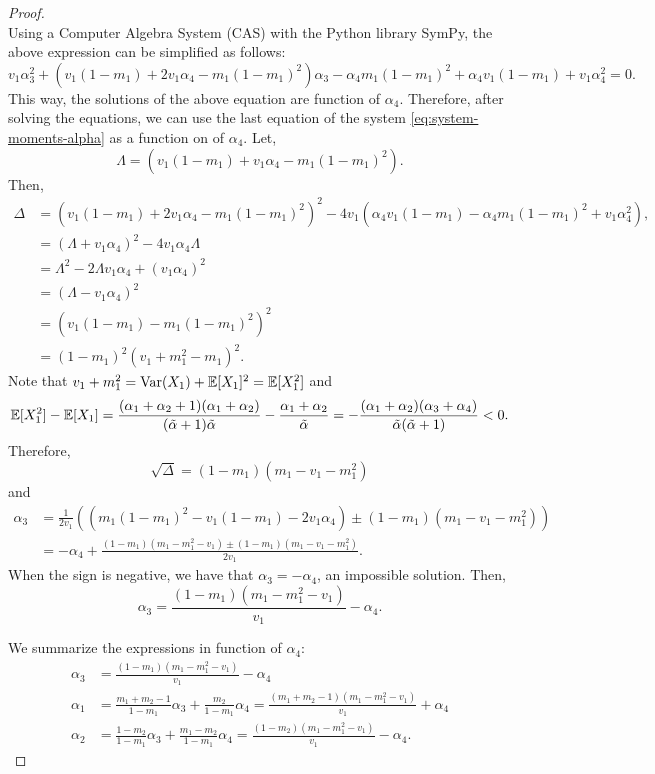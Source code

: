 \begin{proof}
\begin{equation*}
\end{equation*}
Using a Computer Algebra System (CAS) with the Python library SymPy, the above
expression can be simplified as follows:
$$
v_1\alpha_3^2 + \left(v_1(1-m_1) + 2v_1\alpha_4 - m_1(1-m_1)^2\right)\alpha_3 - \alpha_4m_1(1-m_1)^2 + \alpha_4v_1(1 - m_1) + v_1\alpha_4^2 = 0.
$$
This way, the solutions of the above equation are function of $\alpha_4$.
Therefore, after solving the equations, we can use the last equation of the
system \eqref{eq:system-moments-alpha} as a function on of $\alpha_4$. Let, 
$$
\Lambda = \left(v_1(1-m_1) + v_1\alpha_4 - m_1(1-m_1)^2\right).
$$
Then, 
\begin{equation*}
  \begin{split}
    \Delta &= \left(v_1(1-m_1) + 2v_1\alpha_4 - m_1(1-m_1)^2\right)^2 - 4v_1(\alpha_4v_1(1 - m_1) - \alpha_4m_1(1-m_1)^2 + v_1\alpha_4^2), \\
    &= \left(\Lambda + v_1\alpha_4\right)^2 - 4v_1\alpha_4\Lambda \\
    &= \Lambda^2 - 2\Lambda v_1\alpha_4 + (v_1\alpha_4)^2 \\
    &= (\Lambda - v_1\alpha_4)^2 \\
    &= \left(v_1(1-m_1) - m_1(1-m_1)^2\right)^2 \\ 
    &= (1 - m_1)^2(v_1 + m_1^2 - m_1)^2.
  \end{split}
\end{equation*}
Note that $v_1 + m_1^2 = \operatorname{Var}(X_1) + \mathbb{E}[X_1]^2 = \mathbb{E}[X_1^2]$ and
$$
\mathbb{E}[X_1^2] - \mathbb{E}[X_1] = \frac{(\alpha_1 + \alpha_2 + 1)(\alpha_1 + \alpha_2)}{(\tilde{\alpha} + 1)\tilde{\alpha}} - \frac{\alpha_1 + \alpha_2}{\tilde{\alpha}} = -\frac{(\alpha_1 + \alpha_2)(\alpha_3 + \alpha_4)}{\tilde{\alpha}(\tilde{\alpha}+1)} < 0.
$$
Therefore, 
$$
\sqrt{\Delta} = (1-m_1)(m_1 - v_1 - m_1^2)
$$
and 
\begin{equation*}
  \begin{split}
    \alpha_3 &= \frac{1}{2v_1}\left(\left(m_1(1-m_1)^2 - v_1(1-m_1) - 2v_1\alpha_4\right) \pm (1-m_1)(m_1 - v_1 - m_1^2)\right) \\
    &= - \alpha_4 + \frac{(1-m_1)(m_1 - m_1^2 - v_1) \pm (1-m_1)(m_1-v_1-m_1^2)}{2v_1}.
  \end{split}
\end{equation*}
When the sign is negative, we have that $\alpha_3 = - \alpha_4$, an impossible
solution. Then, 
$$
\alpha_3 = \frac{(1-m_1)(m_1 - m_1^2 - v_1)}{v_1} - \alpha_4.
$$

We summarize the expressions in function of $\alpha_4$: 
\begin{align*}
  \alpha_3 &= \frac{(1-m_1)(m_1 - m_1^2 - v_1)}{v_1} - \alpha_4 \\
  \alpha_1 &= \frac{m_1+m_2-1}{1-m_1}\alpha_3 + \frac{m_2}{1-m_1}\alpha_4 = \frac{(m_1 + m_2 - 1)(m_1 - m_1^2 - v_1)}{v_1} + \alpha_4 \\
  \alpha_2 &= \frac{1-m_2}{1-m_1}\alpha_3 + \frac{m_1-m_2}{1-m_1}\alpha_4 = \frac{(1 - m_2)(m_1 - m_1^2 - v_1)}{v_1} - \alpha_4 .
\end{align*}


\end{proof}

